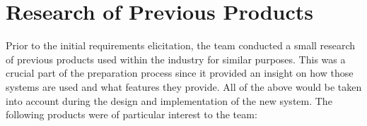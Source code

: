 \documentclass{l3proj}
\begin{document}
\section{Research of Previous Products}
\par
Prior to the initial requirements elicitation, the team conducted a small research of previous products used within the industry for similar purposes. This was a crucial part of the preparation process since it provided an insight on how those systems are used and what features they provide. All of the above would be taken into account during the design and implementation of the new system. The following products were of particular interest to the team:\\
\end{document}
